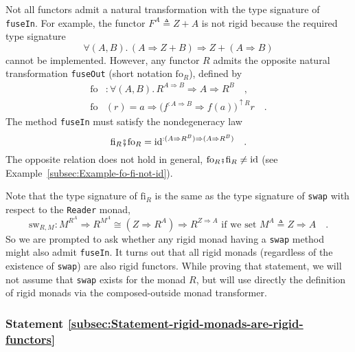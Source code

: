 Not all functors admit a natural transformation with the type signature
of \lstinline!fuseIn!.
For example, the functor $F^{A}\triangleq Z+A$ is not rigid because
the required type signature 
\[
\forall(A,B).\,\left(A\Rightarrow Z+B\right)\Rightarrow Z+\left(A\Rightarrow B\right)
\]
cannot be implemented. However, any functor $R$ admits the opposite
natural transformation \lstinline!fuseOut!
(short notation $\text{fo}_{R}$), defined by
\begin{align}
\text{fo} & :\forall(A,B).\,R^{A\Rightarrow B}\Rightarrow A\Rightarrow R^{B}\quad,\nonumber \\
\text{fo} & \left(r\right)=a\Rightarrow\big(f^{:A\Rightarrow B}\Rightarrow f\left(a\right)\big)^{\uparrow R}r\quad.\label{eq:fuseOut-def}
\end{align}
The method \lstinline!fuseIn!
must satisfy the nondegeneracy law 
\begin{equation}
\text{fi}_{R}\bef\text{fo}_{R}=\text{id}^{:(A\Rightarrow R^{B})\Rightarrow(A\Rightarrow R^{B})}\quad.\label{eq:rigid-non-degeneracy-law}
\end{equation}
The opposite relation does not hold in general, $\text{fo}_{R}\bef\text{fi}_{R}\neq\text{id}$
(see Example~\ref{subsec:Example-fo-fi-not-id}).

Note that the type signature of $\text{fi}_{R}$ is the same as the
type signature of \lstinline!swap!
with respect to the \lstinline!Reader!
monad,
\[
\text{sw}_{R,M}:M^{R^{A}}\Rightarrow R^{M^{A}}\cong(Z\Rightarrow R^{A})\Rightarrow R^{Z\Rightarrow A}\text{ if we set }M^{A}\triangleq Z\Rightarrow A\quad.
\]
So we are prompted to ask whether any rigid monad having a \lstinline!swap!
method might also admit \lstinline!fuseIn!.
It turns out that all rigid monads (regardless of the existence of
\lstinline!swap!) are also
rigid functors. While proving that statement, we will not assume that
\lstinline!swap! exists
for the monad $R$, but will use directly the definition of rigid
monads via the composed-outside monad transformer.

\subsubsection{Statement \label{subsec:Statement-rigid-monads-are-rigid-functors}\ref{subsec:Statement-rigid-monads-are-rigid-functors}}

